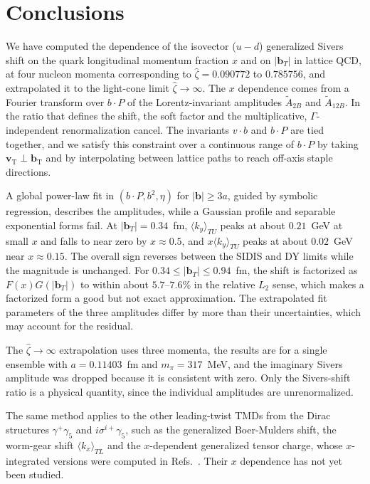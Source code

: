 \documentclass[aps,prd,twocolumn,amsmath,amssymb,floatfix]{revtex4-2}
\newcommand{\tAmp}{\widetilde{A}}
\newcommand{\vect}[1]{\ensuremath{\boldsymbol{#1}}}
\newcommand{\vprp}[1]{\vect{#1}_{\mathrm T}}
\begin{document}
\section{Conclusions}
\label{sec:conclusions}

We have computed the dependence of the isovector ($u-d$) generalized Sivers shift on the quark longitudinal momentum fraction $x$ and on $|\vect{b}_T|$ in lattice QCD, at four nucleon momenta corresponding to $\hat\zeta=0.090772$ to $0.785756$, and extrapolated it to the light-cone limit $\hat\zeta\to\infty$. The $x$ dependence comes from a Fourier transform over $b\cdot P$ of the Lorentz-invariant amplitudes $\tAmp_{2B}$ and $\tAmp_{12B}$. In the ratio that defines the shift, the soft factor and the multiplicative, $\Gamma$-independent renormalization cancel. The invariants $v\cdot b$ and $b\cdot P$ are tied together, and we satisfy this constraint over a continuous range of $b\cdot P$ by taking $\vprp{v}\perp\vprp{b}$ and by interpolating between lattice paths to reach off-axis staple directions.

A global power-law fit in $(b\cdot P,b^2,\eta)$ for $|\vect{b}|\ge3a$, guided by symbolic regression, describes the amplitudes, while a Gaussian profile and separable exponential forms fail. At $|\vect{b}_T|=0.34$~fm, $\langle k_y\rangle_{TU}$ peaks at about $0.21$~GeV at small $x$ and falls to near zero by $x\approx0.5$, and $x\langle k_y\rangle_{TU}$ peaks at about $0.02$~GeV near $x\approx0.15$. The overall sign reverses between the SIDIS and DY limits while the magnitude is unchanged. For $0.34\le|\vect{b}_T|\le0.94$~fm, the shift is factorized as $F(x)G(|\vect{b}_T|)$ to within about $5.7$--$7.6\%$ in the relative $L_2$ sense, which makes a factorized form a good but not exact approximation. The extrapolated fit parameters of the three amplitudes differ by more than their uncertainties, which may account for the residual.

The $\hat\zeta\to\infty$ extrapolation uses three momenta, the results are for a single ensemble with $a=0.11403$~fm and $m_\pi=317$~MeV, and the imaginary Sivers amplitude was dropped because it is consistent with zero. Only the Sivers-shift ratio is a physical quantity, since the individual amplitudes are unrenormalized.

The same method applies to the other leading-twist TMDs from the Dirac structures $\gamma^+\gamma_5$ and $i\sigma^{i+}\gamma_5$, such as the generalized Boer-Mulders shift, the worm-gear shift $\langle k_x\rangle_{TL}$ and the $x$-dependent generalized tensor charge, whose $x$-integrated versions were computed in Refs.~\cite{Musch:2011er,Musch:2010ka}. Their $x$ dependence has not yet been studied.
\end{document}
